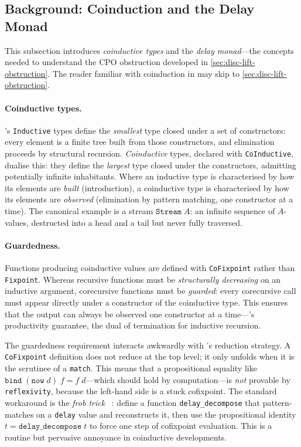 \subsection{Background: Coinduction and the Delay Monad}
\label{sec:disc-lift-bg}

This subsection introduces \emph{coinductive types} and the
\emph{delay monad}---the concepts needed to understand the CPO
obstruction developed in \cref{sec:disc-lift-obstruction}.
The reader familiar with coinduction in \Rocq{} may skip to
\cref{sec:disc-lift-obstruction}.

\paragraph{Coinductive types.}
\Rocq{}'s \texttt{Inductive} types define the \emph{smallest} type closed
under a set of constructors: every element is a finite tree built from
those constructors, and elimination proceeds by structural recursion.
\emph{Coinductive} types, declared with \texttt{CoInductive}, dualise
this: they define the \emph{largest} type closed under the constructors,
admitting potentially infinite inhabitants.
Where an inductive type is characterised by how its elements are
\emph{built} (introduction), a coinductive type is characterised by
how its elements are \emph{observed} (elimination by pattern matching,
one constructor at a time).
The canonical example is a stream $\texttt{Stream}\;A$: an infinite
sequence of $A$-values, destructed into a head and a tail but never
fully traversed.

\paragraph{Guardedness.}
Functions producing coinductive values are defined with
\texttt{CoFixpoint} rather than \texttt{Fixpoint}.
Whereas recursive functions must be \emph{structurally decreasing} on
an inductive argument, corecursive functions must be
\emph{guarded}: every corecursive call must appear directly under a
constructor of the coinductive type.
This ensures that the output can always be observed one constructor
at a time---\Rocq{}'s productivity guarantee, the dual of
termination for inductive recursion.

The guardedness requirement interacts awkwardly with \Rocq{}'s
reduction strategy.
A \texttt{CoFixpoint} definition does not reduce at the top level;
it only unfolds when it is the scrutinee of a \texttt{match}.
This means that a propositional equality like
$\texttt{bind}\;(\texttt{now}\;d)\;f = f\;d$---which should hold by
computation---is \emph{not} provable by \texttt{reflexivity},
because the left-hand side is a stuck cofixpoint.
The standard workaround is the \emph{frob trick}%
~\cite{Capretta2005}: define a function
\texttt{delay\_decompose} that pattern-matches on a \texttt{delay}
value and reconstructs it, then use the propositional identity
$t = \texttt{delay\_decompose}\;t$ to force one step of cofixpoint
evaluation.
This is a routine but pervasive annoyance in coinductive developments.

